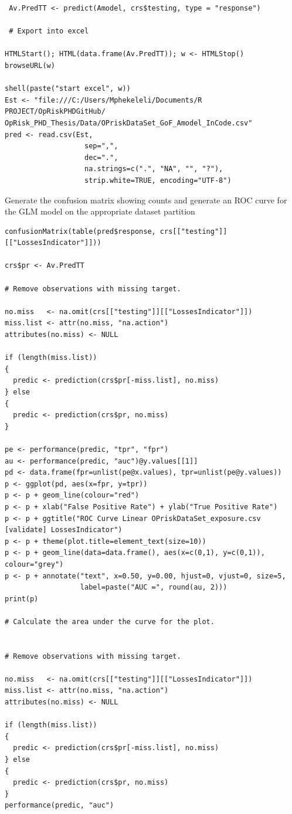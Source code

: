 \documentclass{DissertateUSU}
\begin{document}
\begin{verbatim}
 Av.PredTT <- predict(Amodel, crs$testing, type = "response")
 
 # Export into excel
 
HTMLStart(); HTML(data.frame(Av.PredTT)); w <- HTMLStop()
browseURL(w)
 
shell(paste("start excel", w))
Est <- "file:///C:/Users/Mphekeleli/Documents/R PROJECT/OpRiskPHDGitHub/
OpRisk_PHD_Thesis/Data/OPriskDataSet_GoF_Amodel_InCode.csv"
pred <- read.csv(Est,
                   sep=",",
                   dec=".",
                   na.strings=c(".", "NA", "", "?"),
                   strip.white=TRUE, encoding="UTF-8")
\end{verbatim}

\normalsize

Generate the confusion matrix showing counts and generate an ROC curve
for the GLM model on the appropriate dataset partition

\begin{verbatim}
confusionMatrix(table(pred$response, crs[["testing"]][["LossesIndicator"]]))

crs$pr <- Av.PredTT

# Remove observations with missing target.

no.miss   <- na.omit(crs[["testing"]][["LossesIndicator"]])
miss.list <- attr(no.miss, "na.action")
attributes(no.miss) <- NULL

if (length(miss.list))
{
  predic <- prediction(crs$pr[-miss.list], no.miss)
} else
{
  predic <- prediction(crs$pr, no.miss)
}

pe <- performance(predic, "tpr", "fpr")
au <- performance(predic, "auc")@y.values[[1]]
pd <- data.frame(fpr=unlist(pe@x.values), tpr=unlist(pe@y.values))
p <- ggplot(pd, aes(x=fpr, y=tpr))
p <- p + geom_line(colour="red")
p <- p + xlab("False Positive Rate") + ylab("True Positive Rate")
p <- p + ggtitle("ROC Curve Linear OPriskDataSet_exposure.csv [validate] LossesIndicator")
p <- p + theme(plot.title=element_text(size=10))
p <- p + geom_line(data=data.frame(), aes(x=c(0,1), y=c(0,1)), colour="grey")
p <- p + annotate("text", x=0.50, y=0.00, hjust=0, vjust=0, size=5,
                  label=paste("AUC =", round(au, 2)))
print(p)

# Calculate the area under the curve for the plot.


# Remove observations with missing target.

no.miss   <- na.omit(crs[["testing"]][["LossesIndicator"]])
miss.list <- attr(no.miss, "na.action")
attributes(no.miss) <- NULL

if (length(miss.list))
{
  predic <- prediction(crs$pr[-miss.list], no.miss)
} else
{
  predic <- prediction(crs$pr, no.miss)
}
performance(predic, "auc")
\end{verbatim}
\end{document}
